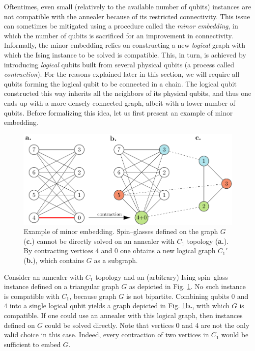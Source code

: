 Oftentimes, even small (relatively to the available number of qubits) instances
are not compatible with the annealer because of its restricted connectivity.
This issue can sometimes be mitigated using a procedure called the \emph{minor
  embedding}, in which the number of qubits is sacrificed for an improvement in
connectivity. Informally, the minor embedding relies on constructing a new
\emph{logical} graph with which the Ising instance to be solved is compatible.
This, in turn, is achieved by introducing \emph{logical} qubits built from
several physical qubits (a process called \emph{contraction}). For the reasons
explained later in this section, we will require all qubits forming the logical
qubit to be connected in a chain. The logical qubit constructed this way
inherits all the neighbors of its physical qubits, and thus one ends up with a
more densely connected graph, albeit with a lower number of qubits. Before
formalizing this idea, let us first present an example of minor embedding.

\begin{example}
  \label{ex:minor-embedding}
  \begin{figure}[b]
    \includegraphics[width=\textwidth]{figures/minor-embedding}
    \caption{
      Example of minor embedding. Spin--glasses defined on the graph $G$
      (\textbf{c.}) cannot be directly solved on an annealer with $C_1$ topology
      (\textbf{a.}). By contracting vertices 4 and 0 one obtains a new logical graph
      $C_1'$ (\textbf{b.}), which contains $G$ as a subgraph. }
    \label{fig:minor-embedding}
  \end{figure}

  Consider an annealer with $C_1$ topology and an (arbitrary) Ising spin--glass
  instance defined on a triangular graph $G$ as depicted in Fig.
  \ref{fig:minor-embedding}. No such instance is compatible with $C_1$, because
  graph $G$ is not bipartite. Combining qubits $0$ and $4$ into a single logical
  qubit yields a graph depicted in Fig. \ref{fig:minor-embedding}\textbf{b.},
  with which $G$ is compatible. If one could use an annealer with this logical
  graph, then instances defined on $G$ could be solved directly. Note that
  vertices 0 and 4 are not the only valid choice in this case. Indeed, every
  contraction of two vertices in $C_1$ would be sufficient to embed $G$.
\end{example}

